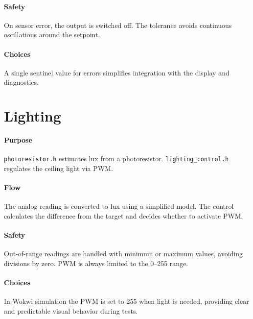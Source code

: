 \paragraph{Safety} On sensor error, the output is switched off. The tolerance avoids continuous oscillations around the setpoint.

\paragraph{Choices} A single sentinel value for errors simplifies integration with the display and diagnostics.

\section{Lighting}
\paragraph{Purpose} \texttt{photoresistor.h} estimates lux from a photoresistor. \texttt{lighting\_control.h} regulates the ceiling light via PWM.

\paragraph{Flow} The analog reading is converted to lux using a simplified model. The control calculates the difference from the target and decides whether to activate PWM.

\paragraph{Safety} Out-of-range readings are handled with minimum or maximum values, avoiding divisions by zero. PWM is always limited to the 0--255 range.

\paragraph{Choices} In Wokwi simulation the PWM is set to 255 when light is needed, providing clear and predictable visual behavior during tests.
